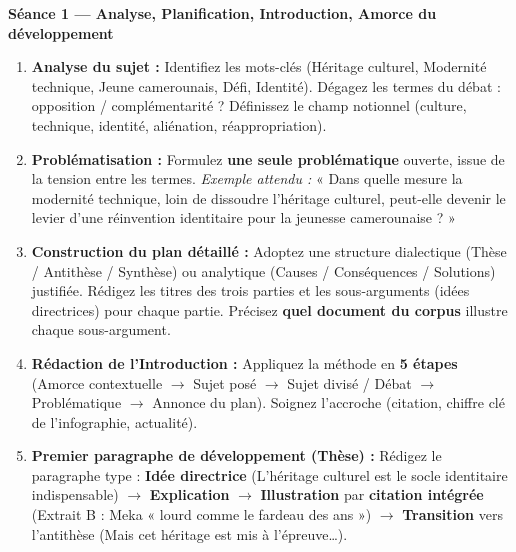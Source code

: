 \documentclass[11pt]{article}
\newcommand{\cle}[1]{{\popxbold\color{popdark}#1}}
\begin{document}
\textbf{Séance 1 — Analyse, Planification, Introduction, Amorce du développement}
\begin{enumerate}
    \item \textbf{Analyse du sujet :} Identifiez les \cle{mots-clés} (Héritage culturel, Modernité technique, Jeune camerounais, Défi, Identité). Dégagez les \cle{termes du débat} : opposition / complémentarité ? Définissez le \cle{champ notionnel} (culture, technique, identité, aliénation, réappropriation).
    \item \textbf{Problématisation :} Formulez \textbf{une seule problématique} ouverte, issue de la tension entre les termes. \textit{Exemple attendu :} « Dans quelle mesure la modernité technique, loin de dissoudre l'héritage culturel, peut-elle devenir le levier d'une réinvention identitaire pour la jeunesse camerounaise ? »
    \item \textbf{Construction du plan détaillé :} Adoptez une structure \cle{dialectique} (Thèse / Antithèse / Synthèse) ou \cle{analytique} (Causes / Conséquences / Solutions) justifiée. Rédigez les \cle{titres des trois parties} et les \cle{sous-arguments} (idées directrices) pour chaque partie. Précisez \textbf{quel document du corpus} illustre chaque sous-argument.
    \item \textbf{Rédaction de l'Introduction :} Appliquez la méthode en \textbf{5 étapes} (Amorce contextuelle $\rightarrow$ Sujet posé $\rightarrow$ Sujet divisé / Débat $\rightarrow$ Problématique $\rightarrow$ Annonce du plan). Soignez l'accroche (citation, chiffre clé de l'infographie, actualité).
    \item \textbf{Premier paragraphe de développement (Thèse) :} Rédigez le paragraphe type : \textbf{Idée directrice} (L'héritage culturel est le socle identitaire indispensable) $\rightarrow$ \textbf{Explication} $\rightarrow$ \textbf{Illustration} par \textbf{citation intégrée} (Extrait B : Meka « lourd comme le fardeau des ans ») $\rightarrow$ \textbf{Transition} vers l'antithèse (Mais cet héritage est mis à l'épreuve…).
\end{enumerate}
\end{document}
